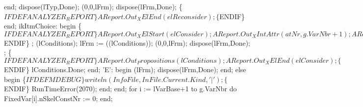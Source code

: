             end;
            dispose(lTyp,Done);
            (0,0,lFrm);
            dispose(lFrm,Done);
            \{$IFDEF ANALYZER_REPORT\}
            AReport.Out_XElEnd(elReconsider);
            \{$ENDIF\}
         end;
      ikItmChoice:
         begin
            \{$IFDEF ANALYZER_REPORT\}
            AReport.Out_XElStart(elConsider);
            AReport.Out_XIntAttr(atNr, g.VarNbr+1);
            AReport.Out_XAttrEnd;
            \{$ENDIF\}
            ;
            (lConditions);
            lFrm := ((lConditions));
            (0,0,lFrm);
            dispose(lFrm,Done);
            ;
            \{$IFDEF ANALYZER_REPORT\}
            AReport.Out_Propositions(lConditions);
            AReport.Out_XElEnd(elConsider);
            \{$ENDIF\}      
            lConditions.Done;
         end;
      'E':
         begin
            (lFrm);
            dispose(lFrm,Done);
         end;
   else
   begin
      \{$IFDEF MDEBUG\}
      writeln(InfoFile,InFile.Current.Kind,'|');
      \{$ENDIF\}
      RunTimeError(2070);
   end;
   end;
   for i := lVarBase+1 to g.VarNbr do FixedVar[i].nSkelConstNr := 0;
end;
\eatline
